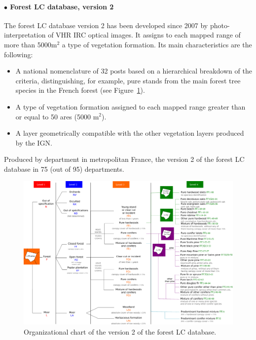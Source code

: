 \paragraph{$\bullet$ Forest LC database, version 2 \\}
The forest LC database version 2 has been developed since 2007 by photo-interpretation of VHR IRC optical images.
It assigns to each mapped range of more than 5000m$^{2}$ a type of vegetation formation.
Its main characteristics are the following:
\begin{itemize}
\item A national nomenclature of 32 posts based on a hierarchical breakdown of the criteria, distinguishing, for example, pure stands from the main forest tree species in the French forest (see Figure~\ref{fig:organigram_BD}).
\item A type of vegetation formation assigned to each mapped range greater than or equal to 50 ares (5000 m$^{2}$).
\item A layer geometrically compatible with the other vegetation layers produced by the IGN.
\end{itemize}

Produced by department in metropolitan France, the version 2 of the forest LC database in 75 (out of 95) departments.

\begin{figure}[htbp]
\begin{center}
\includegraphics[width=\textwidth]{Figures/v2_organigram}
\caption{Organizational chart of the version 2 of the forest LC database.}
\label{fig:organigram_BD}
\end{center}
\end{figure}


